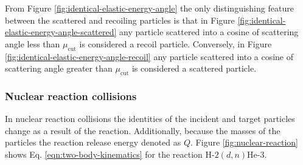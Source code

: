 From Figure \ref{fig:identical-elastic-energy-angle} the only distinguishing feature between the scattered and recoiling particles is that in Figure \ref{fig:identical-elastic-energy-angle-scattered} any particle scattered into a cosine of scattering angle less than $\mu_{\text{cut}}$ is considered a recoil particle. Conversely, in Figure \ref{fig:identical-elastic-energy-angle-recoil} any particle scattered into a cosine of scattering angle greater than $\mu_{\text{cut}}$ is considered a scattered particle.

\subsubsection{Nuclear reaction collisions}
In nuclear reaction collisions the identities of the incident and target particles change as a result of the reaction. Additionally, because the masses of the particles the reaction release energy denoted as $Q$. Figure \ref{fig:nuclear-reaction} shows Eq. \eqref{eqn:two-body-kinematics} for the reaction $\text{H-2}(d,n)\text{He-3}$.
